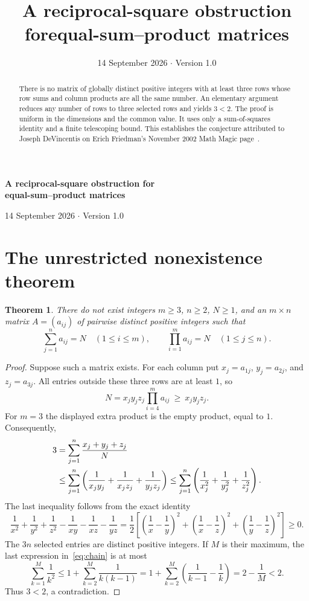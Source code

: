 \documentclass[11pt]{article}
\title{\vspace{-1.5em}\textbf{A reciprocal-square obstruction for\newline equal-sum--product matrices}}
\author{}
\date{14 September 2026 \quad $\cdot$ \quad Version 1.0}
\newtheorem{theorem}{Theorem}
\begin{document}
\begin{center}
{\Large\bfseries A reciprocal-square obstruction for\\[3pt]
equal-sum--product matrices}\par
\vspace{6pt}
{\small 14 September 2026 \quad $\cdot$ \quad Version 1.0}
\end{center}
\vspace{-8pt}
\begin{abstract}
There is no matrix of globally distinct positive integers with at least three
rows whose row sums and column products are all the same number. An elementary
argument reduces any number of rows to three selected rows and yields
$3<2$. The proof is uniform in the dimensions and the common value. It uses
only a sum-of-squares identity and a finite telescoping bound. This establishes
the conjecture attributed to Joseph DeVincentis on Erich Friedman's
November 2002 Math Magic page~\cite{friedman}.
\end{abstract}

\section{The unrestricted nonexistence theorem}
\begin{theorem}\label{thm:main}
There do not exist integers $m\ge3$, $n\ge2$, $N\ge1$, and an
$m\times n$ matrix $A=(a_{ij})$ of pairwise distinct positive integers such that
\[
 \sum_{j=1}^{n}a_{ij}=N\quad(1\le i\le m),
 \qquad
 \prod_{i=1}^{m}a_{ij}=N\quad(1\le j\le n).
\]
\end{theorem}
\begin{proof}
Suppose such a matrix exists. For each column put
$x_j=a_{1j}$, $y_j=a_{2j}$, and $z_j=a_{3j}$. All entries outside these
three rows are at least $1$, so
\[
 N=x_jy_jz_j\prod_{i=4}^{m}a_{ij}\ \ge\ x_jy_jz_j.
\]
For $m=3$ the displayed extra product is the empty product, equal to $1$.
Consequently,
\begin{align}
3
&=\sum_{j=1}^{n}\frac{x_j+y_j+z_j}{N} \notag\\
&\le\sum_{j=1}^{n}\left(\frac1{x_jy_j}+\frac1{x_jz_j}+\frac1{y_jz_j}\right)
 \le\sum_{j=1}^{n}\left(\frac1{x_j^2}+\frac1{y_j^2}+\frac1{z_j^2}\right).
\label{eq:chain}
\end{align}
The last inequality follows from the exact identity
\[
\frac1{x^2}+\frac1{y^2}+\frac1{z^2}
-\frac1{xy}-\frac1{xz}-\frac1{yz}
=\frac12\left[
\left(\frac1x-\frac1y\right)^2+
\left(\frac1x-\frac1z\right)^2+
\left(\frac1y-\frac1z\right)^2\right]\ge0.
\]
The $3n$ selected entries are distinct positive integers. If $M$ is their
maximum, the last expression in~\eqref{eq:chain} is at most
\[
\sum_{k=1}^{M}\frac1{k^2}
\le 1+\sum_{k=2}^{M}\frac1{k(k-1)}
=1+\sum_{k=2}^{M}\left(\frac1{k-1}-\frac1k\right)
=2-\frac1M<2.
\]
Thus $3<2$, a contradiction.
\end{proof}
\end{document}
